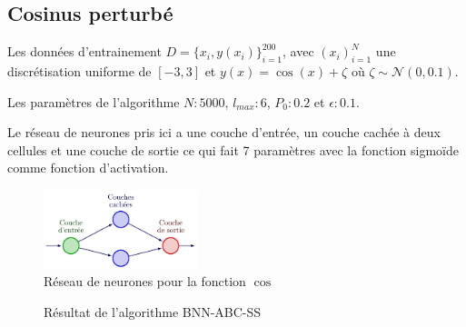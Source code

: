 \documentclass[french,12pt]{article}
\begin{document}
\subsection{Cosinus perturbé}

Les données d'entrainement $D = \{x_i , y(x_i)\}_{i = 1}^{200}$, avec $(x_i)_{i = 1}^N$
une discrétisation uniforme de $[-3, 3]$ et $y(x) = \cos(x) + \zeta$ où $\zeta \sim \mathcal{N}(0, 0.1)$.

Les paramètres de l'algorithme $N : 5000$, $l_{max} : 6$, $P_0 : 0.2$ et $\epsilon : 0.1$.

Le réseau de neurones pris ici a une couche d'entrée, un couche cachée à deux cellules et une couche de sortie ce qui
fait 7 paramètres avec la fonction sigmoïde comme fonction d'activation.

\begin{figure}[H]
    \centering
    \includegraphics[width = 0.4\textwidth]{FNN/Images/fnnCos/fnnCos_page-0001.jpg}
    \caption[short]{Réseau de neurones pour la fonction $\cos$}
\end{figure}


\begin{figure}[H]
    \centering
    \caption[short]{Résultat de l'algorithme BNN-ABC-SS}
\end{figure}
\end{document}
